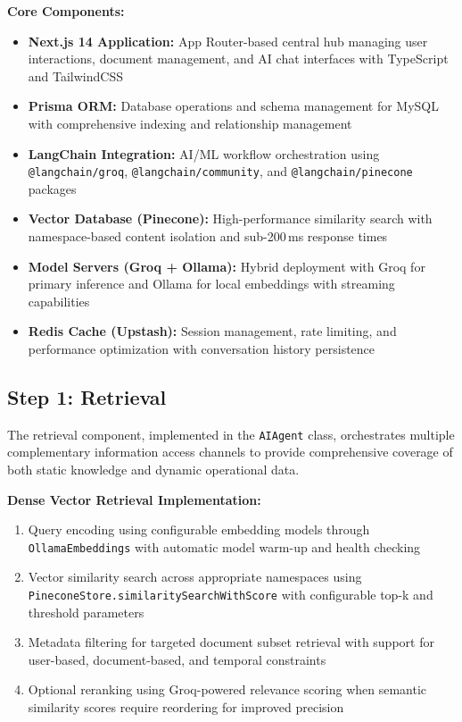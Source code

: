 \textbf{Core Components:}
\begin{itemize}
    \item \textbf{Next.js 14 Application:} App Router-based central hub managing user interactions, document management, and AI chat interfaces with TypeScript and TailwindCSS
    \item \textbf{Prisma ORM:} Database operations and schema management for MySQL with comprehensive indexing and relationship management
    \item \textbf{LangChain Integration:} AI/ML workflow orchestration using \texttt{@langchain/groq}, \texttt{@langchain/community}, and \texttt{@langchain/pinecone} packages
    \item \textbf{Vector Database (Pinecone):} High-performance similarity search with namespace-based content isolation and sub-200\,ms response times
    \item \textbf{Model Servers (Groq + Ollama):} Hybrid deployment with Groq for primary inference and Ollama for local embeddings with streaming capabilities
    \item \textbf{Redis Cache (Upstash):} Session management, rate limiting, and performance optimization with conversation history persistence
\end{itemize}

\subsection{Step 1: Retrieval}
\label{subsec:retrieval_s2}

The retrieval component, implemented in the \texttt{AIAgent} class, orchestrates multiple complementary information access channels to provide comprehensive coverage of both static knowledge and dynamic operational data.

\textbf{Dense Vector Retrieval Implementation:}
\begin{enumerate}
    \item Query encoding using configurable embedding models through \texttt{OllamaEmbeddings} with automatic model warm-up and health checking
    \item Vector similarity search across appropriate namespaces using \texttt{PineconeStore.similaritySearchWithScore} with configurable top-k and threshold parameters
    \item Metadata filtering for targeted document subset retrieval with support for user-based, document-based, and temporal constraints
    \item Optional reranking using Groq-powered relevance scoring when semantic similarity scores require reordering for improved precision
\end{enumerate}

